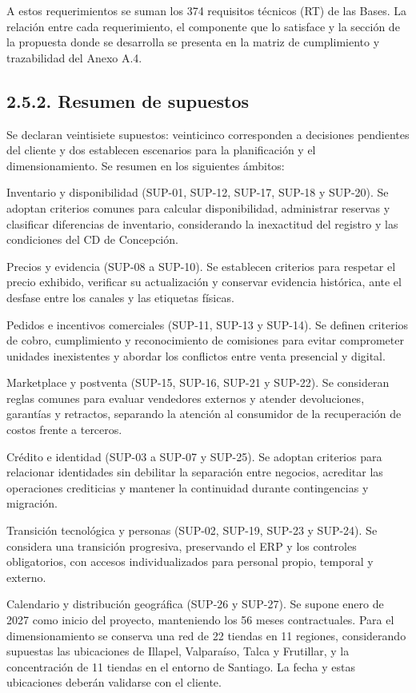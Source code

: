 \documentclass[11pt]{article}
\begin{document}
A estos requerimientos se suman los 374 requisitos técnicos (RT) de las Bases. La relación entre cada requerimiento, el componente que lo satisface y la sección de la propuesta donde se desarrolla se presenta en la matriz de cumplimiento y trazabilidad del Anexo A.4.

\subsection{2.5.2. Resumen de supuestos}\label{resumen-de-supuestos}

Se declaran veintisiete supuestos: veinticinco corresponden a decisiones pendientes del cliente y dos establecen escenarios para la planificación y el dimensionamiento. Se resumen en los siguientes ámbitos:

Inventario y disponibilidad (SUP-01, SUP-12, SUP-17, SUP-18 y SUP-20). Se adoptan criterios comunes para calcular disponibilidad, administrar reservas y clasificar diferencias de inventario, considerando la inexactitud del registro y las condiciones del CD de Concepción.

Precios y evidencia (SUP-08 a SUP-10). Se establecen criterios para respetar el precio exhibido, verificar su actualización y conservar evidencia histórica, ante el desfase entre los canales y las etiquetas físicas.

Pedidos e incentivos comerciales (SUP-11, SUP-13 y SUP-14). Se definen criterios de cobro, cumplimiento y reconocimiento de comisiones para evitar comprometer unidades inexistentes y abordar los conflictos entre venta presencial y digital.

Marketplace y postventa (SUP-15, SUP-16, SUP-21 y SUP-22). Se consideran reglas comunes para evaluar vendedores externos y atender devoluciones, garantías y retractos, separando la atención al consumidor de la recuperación de costos frente a terceros.

Crédito e identidad (SUP-03 a SUP-07 y SUP-25). Se adoptan criterios para relacionar identidades sin debilitar la separación entre negocios, acreditar las operaciones crediticias y mantener la continuidad durante contingencias y migración.

Transición tecnológica y personas (SUP-02, SUP-19, SUP-23 y SUP-24). Se considera una transición progresiva, preservando el ERP y los controles obligatorios, con accesos individualizados para personal propio, temporal y externo.

Calendario y distribución geográfica (SUP-26 y SUP-27). Se supone enero de 2027 como inicio del proyecto, manteniendo los 56 meses contractuales. Para el dimensionamiento se conserva una red de 22 tiendas en 11 regiones, considerando supuestas las ubicaciones de Illapel, Valparaíso, Talca y Frutillar, y la concentración de 11 tiendas en el entorno de Santiago. La fecha y estas ubicaciones deberán validarse con el cliente.
\end{document}
